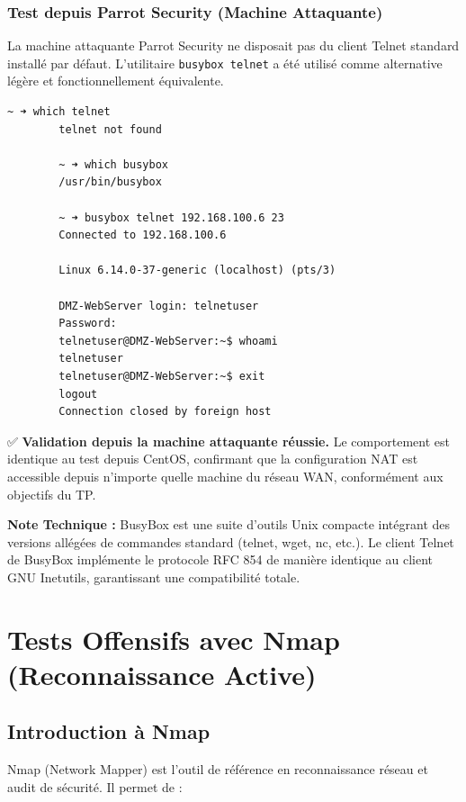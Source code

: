 \documentclass[12pt,a4paper,openany]{report}
\begin{document}
	\subsection{Test depuis Parrot Security (Machine Attaquante)}
	
	La machine attaquante Parrot Security ne disposait pas du client Telnet standard 
	installé par défaut. L'utilitaire \texttt{busybox telnet} a été utilisé comme 
	alternative légère et fonctionnellement équivalente.
	
	\begin{lstlisting}[caption=Test Telnet depuis Parrot Security (busybox)]
		~ ➜ which telnet
		telnet not found
		
		~ ➜ which busybox
		/usr/bin/busybox
		
		~ ➜ busybox telnet 192.168.100.6 23
		Connected to 192.168.100.6
		
		Linux 6.14.0-37-generic (localhost) (pts/3)
		
		DMZ-WebServer login: telnetuser
		Password: 
		telnetuser@DMZ-WebServer:~$ whoami
		telnetuser
		telnetuser@DMZ-WebServer:~$ exit
		logout
		Connection closed by foreign host
	\end{lstlisting}
	
	✅ \textbf{Validation depuis la machine attaquante réussie.} Le comportement est 
	identique au test depuis CentOS, confirmant que la configuration NAT est accessible 
	depuis n'importe quelle machine du réseau WAN, conformément aux objectifs du TP.
	
	\textbf{Note Technique :} BusyBox est une suite d'outils Unix compacte intégrant 
	des versions allégées de commandes standard (telnet, wget, nc, etc.). Le client 
	Telnet de BusyBox implémente le protocole RFC 854 de manière identique au client 
	GNU Inetutils, garantissant une compatibilité totale.
	
	\chapter{Tests Offensifs avec Nmap (Reconnaissance Active)}
	
	\section{Introduction à Nmap}
	Nmap (Network Mapper) est l'outil de référence en reconnaissance réseau et audit de sécurité. Il permet de :
	
\end{document}
